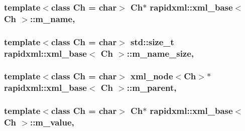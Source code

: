 \subsubsection[{m\+\_\+name}]{\setlength{\rightskip}{0pt plus 5cm}template$<$class Ch  = char$>$ Ch$\ast$ {\bf rapidxml\+::xml\+\_\+base}$<$ Ch $>$\+::m\+\_\+name\hspace{0.3cm}{\ttfamily [protected]}, {\ttfamily [inherited]}}\label{classrapidxml_1_1xml__base_afd9851ed43e14619db0d7075ef8e9e8a}
\hypertarget{classrapidxml_1_1xml__base_a5a8c76a7274b4180213796422c4df76f}{}
\subsubsection[{m\+\_\+name\+\_\+size}]{\setlength{\rightskip}{0pt plus 5cm}template$<$class Ch  = char$>$ std\+::size\+\_\+t {\bf rapidxml\+::xml\+\_\+base}$<$ Ch $>$\+::m\+\_\+name\+\_\+size\hspace{0.3cm}{\ttfamily [protected]}, {\ttfamily [inherited]}}\label{classrapidxml_1_1xml__base_a5a8c76a7274b4180213796422c4df76f}
\hypertarget{classrapidxml_1_1xml__base_a90d5f660f078f66563fd7b2d8387ccb0}{}
\subsubsection[{m\+\_\+parent}]{\setlength{\rightskip}{0pt plus 5cm}template$<$class Ch  = char$>$ {\bf xml\+\_\+node}$<$Ch$>$$\ast$ {\bf rapidxml\+::xml\+\_\+base}$<$ Ch $>$\+::m\+\_\+parent\hspace{0.3cm}{\ttfamily [protected]}, {\ttfamily [inherited]}}\label{classrapidxml_1_1xml__base_a90d5f660f078f66563fd7b2d8387ccb0}
\hypertarget{classrapidxml_1_1xml__base_a278a1ea63b0b70219b946cec47fa00ea}{}
\subsubsection[{m\+\_\+value}]{\setlength{\rightskip}{0pt plus 5cm}template$<$class Ch  = char$>$ Ch$\ast$ {\bf rapidxml\+::xml\+\_\+base}$<$ Ch $>$\+::m\+\_\+value\hspace{0.3cm}{\ttfamily [protected]}, {\ttfamily [inherited]}}\label{classrapidxml_1_1xml__base_a278a1ea63b0b70219b946cec47fa00ea}
\hypertarget{classrapidxml_1_1xml__base_aa3a49d8ceddb8a8d7edb773a2226b89c}{}
